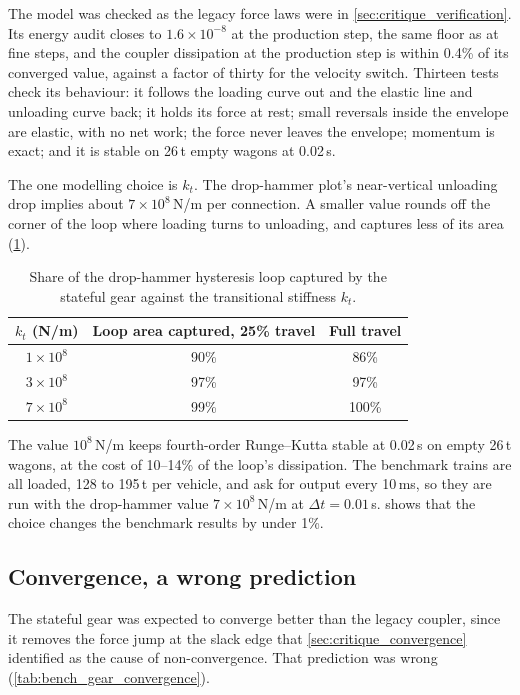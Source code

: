 The model was checked as the legacy force laws were in \cref{sec:critique_verification}. Its energy audit closes to $1.6\times10^{-8}$ at the production step, the same floor as at fine steps, and the coupler dissipation at the production step is within 0.4\% of its converged value, against a factor of thirty for the velocity switch. Thirteen tests check its behaviour: it follows the loading curve out and the elastic line and unloading curve back; it holds its force at rest; small reversals inside the envelope are elastic, with no net work; the force never leaves the envelope; momentum is exact; and it is stable on 26\,t empty wagons at 0.02\,s.

The one modelling choice is $k_t$. The drop-hammer plot's near-vertical unloading drop implies about $7\times10^{8}$\,N/m per connection. A smaller value rounds off the corner of the loop where loading turns to unloading, and captures less of its area (\cref{tab:bench_kt}).

\begin{table}[htbp]
    \centering
    \small
    \begin{tabular}{ccc}
        \toprule
        $k_t$ (N/m) & Loop area captured, 25\% travel & Full travel \\
        \midrule
        $1\times10^{8}$ & 90\% & 86\% \\
        $3\times10^{8}$ & 97\% & 97\% \\
        $7\times10^{8}$ & 99\% & 100\% \\
        \bottomrule
    \end{tabular}
    \caption{Share of the drop-hammer hysteresis loop captured by the stateful gear against the transitional stiffness $k_t$.}
    \label{tab:bench_kt}
\end{table}

The value $10^{8}$\,N/m keeps fourth-order Runge--Kutta stable at 0.02\,s on empty 26\,t wagons, at the cost of 10--14\% of the loop's dissipation. The benchmark trains are all loaded, 128 to 195\,t per vehicle, and ask for output every 10\,ms, so they are run with the drop-hammer value $7\times10^{8}$\,N/m at $\Delta t = 0.01$\,s.  shows that the choice changes the benchmark results by under 1\%.

\subsection{Convergence, a wrong prediction}

The stateful gear was expected to converge better than the legacy coupler, since it removes the force jump at the slack edge that \cref{sec:critique_convergence} identified as the cause of non-convergence. That prediction was wrong (\cref{tab:bench_gear_convergence}).

